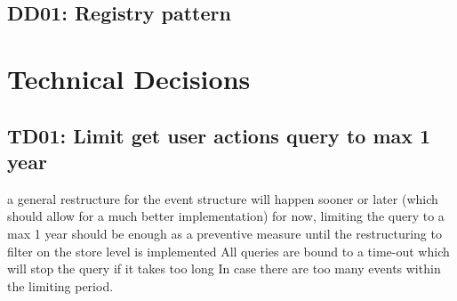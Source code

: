 \subsection{DD01: Registry pattern}

\section{Technical Decisions}

\subsection{TD01: Limit get user actions query to max 1 year}

a general restructure for the event structure will happen sooner or later (which should allow for a much better implementation)
for now, limiting the query to a max 1 year should be enough as a preventive measure until the restructuring to filter on the store level is implemented
All queries are bound to a time-out which will stop the query if it takes too long In case there are too many events within the limiting period.

